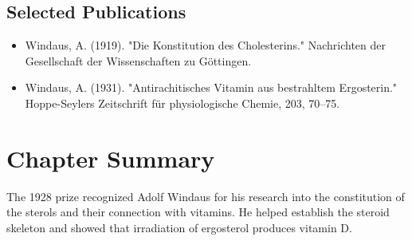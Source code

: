 \subsection*{Selected Publications}

\begin{itemize}

\item Windaus, A. (1919). "Die Konstitution des Cholesterins." Nachrichten der Gesellschaft der Wissenschaften zu Göttingen.

\item Windaus, A. (1931). "Antirachitisches Vitamin aus bestrahltem Ergosterin." Hoppe-Seylers Zeitschrift für physiologische Chemie, 203, 70--75.

\end{itemize}

\clearpage

\section*{Chapter Summary}

The 1928 prize recognized Adolf Windaus for his research into the constitution of the sterols and their connection with vitamins. He helped establish the steroid skeleton and showed that irradiation of ergosterol produces vitamin D.
